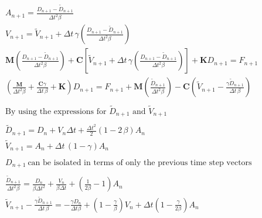 \documentclass{article}
\begin{document}
			\begin{align*}
				&A_{{n+1}}={\frac {D_{{n+1}}-\widetilde{D}_{{n+1}}}{{\Delta t}^{2}\beta}}\\
				&V_{{n+1}}=\widetilde{V}_{{n+1}}+\Delta t\,\gamma \left( {\frac {D_{{n+1}}-\widetilde{D}_{{n+1}
}}{{\Delta t}^{2}\beta}} \right) \\
				&\textbf{M} \left( {\frac {D_{{n+1}}-\widetilde{D}_{{n+1}}}{{\Delta t}^{2}\beta}} \right) +\textbf{C}\left[{{\widetilde{V}_{{n+1}}+\Delta t\,\gamma \left( {\frac {D_{{n+1}}-\widetilde{D}_{{n+1}}}{{\Delta t}^{2}\beta}} \right) }}\right]+\textbf{K}D_{{n+1}}=F_{{n+1}}\\
				&\left( {\frac {\textbf{M}}{{\Delta t}^{2}\beta}}+{\frac {\textbf{C}\gamma}{\Delta t\,\beta}}+\textbf{K} \right) D_{{n+1}}=F_{{n+1}}+\textbf{M} \left( {\frac {\widetilde{D}_{{n+1}}}{{\Delta t}^{2}\beta}} \right) -\textbf{C}\left({{\widetilde{V}_{{n+1}}-{\frac {\gamma \widetilde{D}_{{n+1}}}{\Delta t\,\beta}}}}\right)\\
				\\&\text{By using the expressions for $\widetilde{D}_{n+1}$ and $\widetilde{V}_{n+1} $}\\ \\
				&\widetilde{D}_{n+1} = D_{{n}} + V_n\Delta t+\frac{{\Delta t}^{2}}{2}\left( 1-2\,\beta \right) A_{{n}}\\
				&\widetilde{V}_{{n+1}}=A_{{n}}+\Delta t\, \left( 1-\gamma \right) A_{{n}}\\
				\\&D_{n+1} \ \text{can be isolated in terms of only the previous time step vectors}\\ \\
				&{\frac {\widetilde{D}_{{n+1}}}{{\Delta t}^{2}\beta}} = \frac{D_n}{\beta {\Delta t}^2} + \frac{V_n}{\beta \Delta t} + \left(\frac{1}{2\beta} - 1\right)A_n\\
				&\widetilde{V}_{{n+1}}-{\frac {\gamma \widetilde{D}_{{n+1}}}{\Delta t\,\beta}} = -{\frac {\gamma D_{{n}}}{\Delta t\beta }}+ \left( 1-{\frac {\gamma}{\beta}} \right) V_{{n}}+\Delta t \left( 1-{\frac {\gamma}{2\beta}}
 \right) A_{{n}}
			\end{align*}
\end{document}
